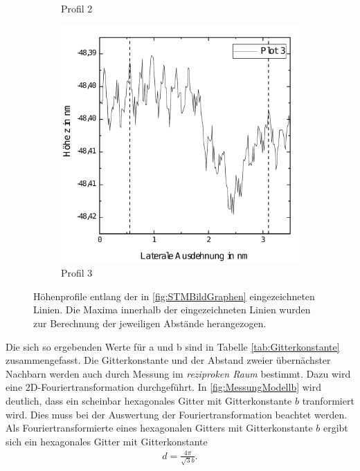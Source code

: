 \documentclass[a4paper,twoside,final]{article}
\begin{document}
\begin{figure}[ht]
\begin{subfigure}{0.3\textwidth}
        \caption{Profil 2}
    \end{subfigure}
    \hspace{0.5cm}
    \begin{subfigure}{0.3\textwidth}
        \includegraphics[width=\textwidth]{Bilder/Graphen_Profil3.pdf}
        \caption{Profil 3}
    \end{subfigure}
    \caption{Höhenprofile entlang der in \ref{fig:STMBildGraphen} eingezeichneten Linien. Die Maxima innerhalb der eingezeichneten Linien wurden zur Berechnung der jeweiligen Abstände herangezogen.}
    \label{fig:HöhenprofileGraphen}
\end{figure}
Die sich so ergebenden Werte für a und b sind in Tabelle \ref{tab:Gitterkonstante} zusammengefasst.
\FloatBarrier
Die Gitterkonstante und der Abstand zweier übernächster Nachbarn werden auch durch Messung im \textit{reziproken Raum} bestimmt. Dazu wird eine 2D-Fouriertransformation durchgeführt. In \ref{fig:MessungModellb} wird deutlich, dass ein scheinbar hexagonales Gitter mit Gitterkonstante $b$ tranformiert wird. Dies muss bei der Auswertung der Fouriertransformation beachtet werden. Als Fouriertransformierte eines hexagonalen Gitters mit Gitterkonstante $b$ ergibt sich ein hexagonales Gitter mit Gitterkonstante
\begin{align}\label{equ:d}
  d = \frac{4\pi}{\sqrt{3}b}.
\end{align}
\end{document}
